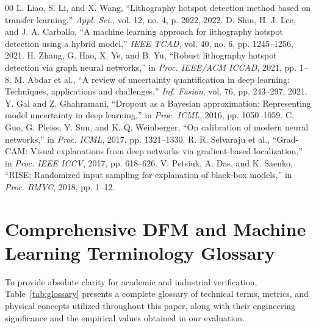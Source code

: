 \documentclass[11pt,journal,onecolumn]{IEEEtran}
\begin{document}
\begin{thebibliography}{00}
 L. Liao, S. Li, and X. Wang, ``Lithography hotspot detection method based on transfer learning,'' \textit{Appl. Sci.}, vol. 12, no. 4, p. 2022, 2022.
 D. Shin, H. J. Lee, and J. A. Carballo, ``A machine learning approach for lithography hotspot detection using a hybrid model,'' \textit{IEEE TCAD}, vol. 40, no. 6, pp. 1245--1256, 2021.
 H. Zhang, G. Hao, X. Ye, and B. Yu, ``Robust lithography hotspot detection via graph neural networks,'' in \textit{Proc. IEEE/ACM ICCAD}, 2021, pp. 1--8.
 M. Abdar et al., ``A review of uncertainty quantification in deep learning: Techniques, applications and challenges,'' \textit{Inf. Fusion}, vol. 76, pp. 243--297, 2021.
 Y. Gal and Z. Ghahramani, ``Dropout as a Bayesian approximation: Representing model uncertainty in deep learning,'' in \textit{Proc. ICML}, 2016, pp. 1050--1059.
 C. Guo, G. Pleiss, Y. Sun, and K. Q. Weinberger, ``On calibration of modern neural networks,'' in \textit{Proc. ICML}, 2017, pp. 1321--1330.
 R. R. Selvaraju et al., ``Grad-CAM: Visual explanations from deep networks via gradient-based localization,'' in \textit{Proc. IEEE ICCV}, 2017, pp. 618--626.
 V. Petsiuk, A. Das, and K. Saenko, ``RISE: Randomized input sampling for explanation of black-box models,'' in \textit{Proc. BMVC}, 2018, pp. 1--12.
\end{thebibliography}

\appendices
\section{Comprehensive DFM and Machine Learning Terminology Glossary}
To provide absolute clarity for academic and industrial verification, Table~\ref{tab:glossary} presents a complete glossary of technical terms, metrics, and physical concepts utilized throughout this paper, along with their engineering significance and the empirical values obtained in our evaluation.
\end{document}
